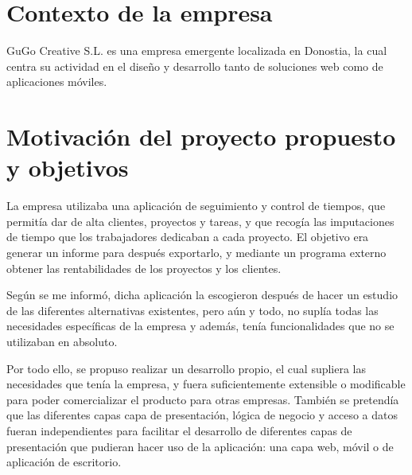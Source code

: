 \section{Contexto de la empresa}
\label{context:company}

GuGo Creative S.L. es una empresa emergente localizada en Donostia, la
cual centra su actividad en el diseño y desarrollo tanto de soluciones web
como de aplicaciones móviles.

\section{Motivación del proyecto propuesto y objetivos}
La empresa utilizaba una aplicación de seguimiento y control de tiempos,
que permitía dar de alta clientes, proyectos y tareas, y que recogía
las imputaciones de tiempo que los trabajadores dedicaban a cada
proyecto. El objetivo era generar un informe para después exportarlo,
y mediante un programa externo obtener las rentabilidades de los
proyectos y los clientes.

Según se me informó, dicha aplicación la escogieron después de hacer un
estudio de las diferentes alternativas existentes, pero aún y todo, no
suplía todas las necesidades específicas de la empresa y además, tenía
funcionalidades que no se utilizaban en absoluto.

Por todo ello, se propuso realizar un desarrollo propio, el cual
supliera las necesidades que tenía la empresa, y fuera suficientemente
extensible o modificable para poder comercializar el producto para otras
empresas. También se pretendía que las diferentes capas \textemdash capa
de presentación, lógica de negocio y acceso a datos \textemdash fueran
independientes para facilitar el desarrollo de diferentes capas de 
presentación que pudieran hacer uso de la aplicación: una capa
web, móvil o de aplicación de escritorio.

